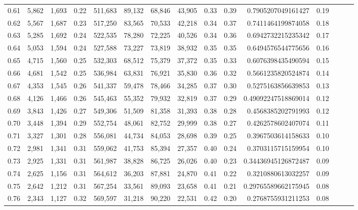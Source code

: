 \begin{tabular}{rrrrrrrrrrrrrrr}
0.61 &   5,862 &  1,693 &  0.22 &  511,683 &   89,132 &   68,846 &   43,905 &  0.33 &  0.39 &    0.7905207049161427 &      0.19 \\
0.62 &   5,567 &  1,687 &  0.23 &  517,250 &   83,565 &   70,533 &   42,218 &  0.34 &  0.37 &    0.7411464199874058 &      0.18 \\
0.63 &   5,285 &  1,692 &  0.24 &  522,535 &   78,280 &   72,225 &   40,526 &  0.34 &  0.36 &    0.6942732215235342 &      0.17 \\
0.64 &   5,053 &  1,594 &  0.24 &  527,588 &   73,227 &   73,819 &   38,932 &  0.35 &  0.35 &    0.6494576544775656 &      0.16 \\
0.65 &   4,715 &  1,560 &  0.25 &  532,303 &   68,512 &   75,379 &   37,372 &  0.35 &  0.33 &    0.6076398435490594 &      0.15 \\
0.66 &   4,681 &  1,542 &  0.25 &  536,984 &   63,831 &   76,921 &   35,830 &  0.36 &  0.32 &    0.5661235820524874 &      0.14 \\
0.67 &   4,353 &  1,545 &  0.26 &  541,337 &   59,478 &   78,466 &   34,285 &  0.37 &  0.30 &    0.5275163856639853 &      0.13 \\
0.68 &   4,126 &  1,466 &  0.26 &  545,463 &   55,352 &   79,932 &   32,819 &  0.37 &  0.29 &   0.49092247518869014 &      0.12 \\
0.69 &   3,843 &  1,426 &  0.27 &  549,306 &   51,509 &   81,358 &   31,393 &  0.38 &  0.28 &    0.4568385202791993 &      0.12 \\
0.70 &   3,448 &  1,394 &  0.29 &  552,754 &   48,061 &   82,752 &   29,999 &  0.38 &  0.27 &    0.4262578602407074 &      0.11 \\
0.71 &   3,327 &  1,301 &  0.28 &  556,081 &   44,734 &   84,053 &   28,698 &  0.39 &  0.25 &    0.3967503614158633 &      0.10 \\
0.72 &   2,981 &  1,341 &  0.31 &  559,062 &   41,753 &   85,394 &   27,357 &  0.40 &  0.24 &    0.3703115715159954 &      0.10 \\
0.73 &   2,925 &  1,331 &  0.31 &  561,987 &   38,828 &   86,725 &   26,026 &  0.40 &  0.23 &   0.34436945126872487 &      0.09 \\
0.74 &   2,625 &  1,156 &  0.31 &  564,612 &   36,203 &   87,881 &   24,870 &  0.41 &  0.22 &    0.3210880613032257 &      0.09 \\
0.75 &   2,642 &  1,212 &  0.31 &  567,254 &   33,561 &   89,093 &   23,658 &  0.41 &  0.21 &   0.29765589662175945 &      0.08 \\
0.76 &   2,343 &  1,127 &  0.32 &  569,597 &   31,218 &   90,220 &   22,531 &  0.42 &  0.20 &    0.2768755931211253 &      0.08 \\

\end{tabular}
